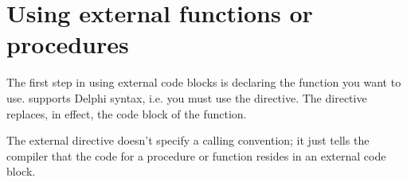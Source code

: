 \section{Using external functions or procedures}
\label{se:ExternalFunction}

The first step in using external code blocks is declaring the function you
want to use. \fpc supports Delphi syntax, i.e. you must use the
 directive. The  directive replaces, in effect,
the code block of the function.

The external directive doesn't specify a calling convention; it just tells
the compiler that the code for a procedure or function resides in an
external code block.

